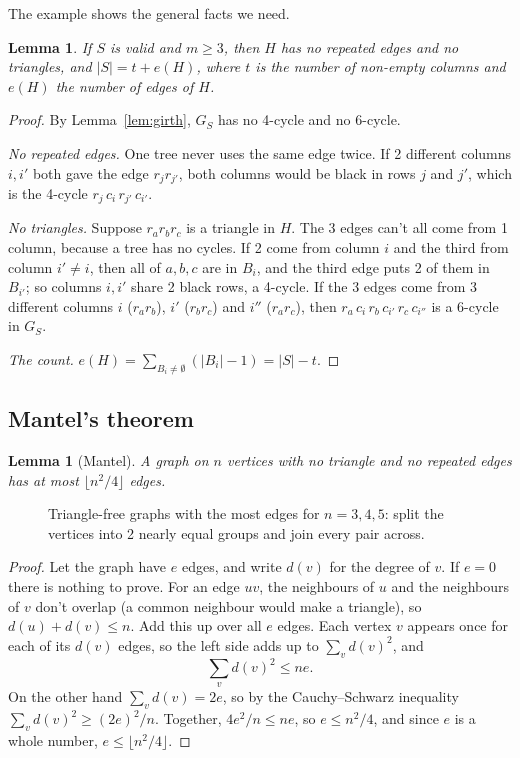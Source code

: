 \documentclass[11pt]{article}
\newtheorem{lemma}[theorem]{Lemma}
\theoremstyle{definition}
\theoremstyle{remark}
\begin{document}
The example shows the general facts we need.

\begin{lemma}\label{lem:H}
If $S$ is valid and $m\ge3$, then $H$ has no repeated edges and no triangles, and
$|S|=t+e(H)$, where $t$ is the number of non-empty columns and $e(H)$ the number of edges of $H$.
\end{lemma}

\begin{proof}
By Lemma~\ref{lem:girth}, $G_S$ has no 4-cycle and no 6-cycle.

\emph{No repeated edges.} One tree never uses the same edge twice. If 2 different columns $i,i'$
both gave the edge $r_jr_{j'}$, both columns would be black in rows $j$ and $j'$, which is the
4-cycle $r_j\,c_i\,r_{j'}\,c_{i'}$.

\emph{No triangles.} Suppose $r_ar_br_c$ is a triangle in $H$. The 3 edges can't all come from 1
column, because a tree has no cycles. If 2 come from column $i$ and the third from column
$i'\ne i$, then all of $a,b,c$ are in $B_i$, and the third edge puts 2 of them in $B_{i'}$; so
columns $i,i'$ share 2 black rows, a 4-cycle. If the 3 edges come from 3 different columns
$i$ ($r_ar_b$), $i'$ ($r_br_c$) and $i''$ ($r_ar_c$), then $r_a\,c_i\,r_b\,c_{i'}\,r_c\,c_{i''}$
is a 6-cycle in $G_S$.

\emph{The count.} $e(H)=\sum_{B_i\ne\emptyset}(|B_i|-1)=|S|-t$.
\end{proof}

\subsection{Mantel's theorem}

\begin{lemma}[Mantel]\label{lem:mantel}
A graph on $n$ vertices with no triangle and no repeated edges has at most $\lfloor n^2/4\rfloor$
edges.
\end{lemma}

\begin{figure}[htbp]
\centering

\caption{Triangle-free graphs with the most edges for $n=3,4,5$: split the vertices into 2
nearly equal groups and join every pair across.}
\label{fig:mantel}
\end{figure}

\begin{proof}
Let the graph have $e$ edges, and write $d(v)$ for the degree of $v$. If $e=0$ there is nothing
to prove. For an edge $uv$, the neighbours of $u$ and the neighbours of $v$ don't overlap (a
common neighbour would make a triangle), so $d(u)+d(v)\le n$. Add this up over all $e$ edges.
Each vertex $v$ appears once for each of its $d(v)$ edges, so the left side adds up to
$\sum_vd(v)^2$, and
\[
\sum_v d(v)^2\le ne.
\]
On the other hand $\sum_vd(v)=2e$, so by the Cauchy--Schwarz inequality
$\sum_vd(v)^2\ge(2e)^2/n$. Together, $4e^2/n\le ne$, so $e\le n^2/4$, and since $e$ is a whole
number, $e\le\lfloor n^2/4\rfloor$.
\end{proof}
\end{document}
